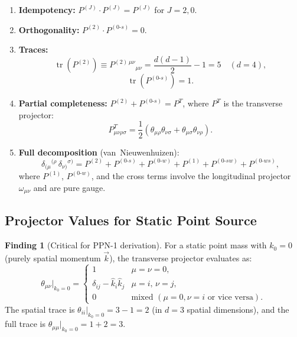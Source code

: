 \documentclass[11pt,a4paper]{article}
\theoremstyle{plain}
\theoremstyle{definition}
\newtheorem{finding}[theorem]{Finding}
\theoremstyle{remark}
\newcommand{\tr}{\operatorname{tr}}
\begin{document}
\begin{enumerate}[nosep,label=(\roman*)]
  \item \textbf{Idempotency:}
    $P^{(J)}\cdot P^{(J)} = P^{(J)}$ for $J = 2, 0$.
  \item \textbf{Orthogonality:}
    $P^{(2)}\cdot P^{(0\text{-}s)} = 0$.
  \item \textbf{Traces:}
    \begin{equation}\label{eq:traces}
      \tr\!\left(P^{(2)}\right)
      \equiv P^{(2)\,\mu\nu}{}_{\mu\nu}
      = \frac{d(d-1)}{2} - 1
      = 5 \quad (d=4),
    \end{equation}
    \begin{equation}
      \tr\!\left(P^{(0\text{-}s)}\right)
      = 1.
    \end{equation}
  \item \textbf{Partial completeness:}
    $P^{(2)} + P^{(0\text{-}s)} = P^T$, where $P^T$ is the
    transverse projector:
    \begin{equation}
      P^{T}_{\mu\nu\rho\sigma}
      = \frac{1}{2}(\theta_{\mu\rho}\theta_{\nu\sigma}
      + \theta_{\mu\sigma}\theta_{\nu\rho}).
    \end{equation}
  \item \textbf{Full decomposition} (van~Nieuwenhuizen):
    \begin{equation}\label{eq:full-decomp}
      \delta_{(\mu}{}^{(\rho}\,\delta_{\nu)}{}^{\sigma)}
      = P^{(2)} + P^{(0\text{-}s)} + P^{(0\text{-}w)}
      + P^{(1)} + P^{(0\text{-}sw)} + P^{(0\text{-}ws)},
    \end{equation}
    where $P^{(1)}$, $P^{(0\text{-}w)}$, and the cross terms
    involve the longitudinal projector $\omega_{\mu\nu}$ and are
    pure gauge.
\end{enumerate}

\subsection{Projector Values for Static Point Source}

\begin{finding}[Critical for PPN-1 derivation]\label{find:proj-static}
For a static point mass with $k_0 = 0$ (purely spatial momentum
$\vec{k}$), the transverse projector evaluates as:
\begin{equation}\label{eq:theta-static}
  \theta_{\mu\nu}\big|_{k_0=0}
  = \begin{cases}
    1 & \mu = \nu = 0,\\
    \delta_{ij} - \hat{k}_i\hat{k}_j & \mu = i,\, \nu = j,\\
    0 & \text{mixed } (\mu = 0, \nu = i \text{ or vice versa}).
  \end{cases}
\end{equation}
The spatial trace is
$\theta_{ii}\big|_{k_0=0} = 3 - 1 = 2$ (in $d = 3$ spatial
dimensions), and the full trace is
$\theta_{\mu\mu}\big|_{k_0=0} = 1 + 2 = 3$.
\end{finding}
\end{document}

